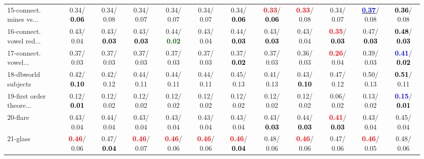 \begin{table}[h]
\begin{center}
{\begin{tabular}{lc|c|c|c|c|c|c|c|c|c|c}
15-connect. mines vs... &   0.34/\textcolor{black}{\textbf{  0.06}} &   0.34/  0.08 &   0.34/  0.07 &   0.34/  0.07 &   0.34/  0.07 &   0.34/\textcolor{black}{\textbf{  0.06}} & \textcolor{red}{\textbf{  0.33}}/\textcolor{black}{\textbf{  0.06}} & \textcolor{red}{\textbf{  0.33}}/  0.08 &   0.34/  0.07 & \underline{\textcolor{blue}{\textbf{  0.37}}}/  0.08 & \textcolor{black}{\textbf{  0.36}}/  0.08 \\
16-connect. vowel red... &   0.43/  0.04 &   0.43/\textcolor{black}{\textbf{  0.03}} &   0.43/\textcolor{black}{\textbf{  0.03}} &   0.44/\textcolor{darkgreen}{\textbf{  0.02}} &   0.43/  0.04 &   0.44/\textcolor{black}{\textbf{  0.03}} &   0.43/\textcolor{black}{\textbf{  0.03}} &   0.43/  0.04 & \textcolor{red}{\textbf{  0.35}}/\textcolor{black}{\textbf{  0.03}} &   0.47/\textcolor{black}{\textbf{  0.03}} & \textcolor{black}{\textbf{  0.48}}/\textcolor{black}{\textbf{  0.03}} \\
17-connect. vowel... &   0.37/  0.03 &   0.37/  0.03 &   0.37/  0.03 &   0.37/  0.03 &   0.37/  0.03 &   0.37/\textcolor{black}{\textbf{  0.02}} &   0.37/  0.03 &   0.36/  0.03 & \textcolor{red}{\textbf{  0.26}}/  0.04 &   0.39/  0.03 & \textcolor{blue}{\textbf{  0.41}}/\textcolor{black}{\textbf{  0.02}} \\
18-dbworld subjects &   0.42/\textcolor{black}{\textbf{  0.10}} &   0.42/  0.12 &   0.44/  0.11 &   0.44/  0.11 &   0.44/  0.11 &   0.45/  0.13 &   0.41/  0.13 &   0.43/\textcolor{black}{\textbf{  0.10}} &   0.47/  0.12 &   0.50/  0.13 & \textcolor{black}{\textbf{  0.51}}/  0.11 \\
19-first order theore... &   0.12/\textcolor{black}{\textbf{  0.01}} &   0.12/  0.02 &   0.12/  0.02 &   0.12/  0.02 &   0.12/  0.02 &   0.12/  0.02 &   0.12/  0.02 &   0.12/  0.02 &   0.06/  0.02 &   0.13/  0.02 & \textcolor{blue}{\textbf{  0.15}}/\textcolor{black}{\textbf{  0.01}} \\
20-flare &   0.43/  0.04 &   0.44/  0.04 &   0.43/  0.04 &   0.43/  0.04 &   0.43/  0.04 &   0.43/  0.04 &   0.43/\textcolor{black}{\textbf{  0.03}} &   0.44/\textcolor{black}{\textbf{  0.03}} & \textcolor{red}{\textbf{  0.41}}/\textcolor{black}{\textbf{  0.03}} &   0.43/  0.04 &   0.45/  0.04 \\
21-glass & \textcolor{red}{\textbf{  0.46}}/  0.06 &   0.47/\textcolor{black}{\textbf{  0.04}} & \textcolor{red}{\textbf{  0.46}}/  0.07 & \textcolor{red}{\textbf{  0.46}}/  0.06 & \textcolor{red}{\textbf{  0.46}}/  0.06 & \textcolor{red}{\textbf{  0.46}}/\textcolor{black}{\textbf{  0.04}} &   0.48/  0.06 & \textcolor{red}{\textbf{  0.46}}/  0.06 &   0.47/  0.06 & \textcolor{red}{\textbf{  0.46}}/  0.05 &   0.48/  0.06 \\ \hline

\end{tabular}}
\end{center}
\end{table}
